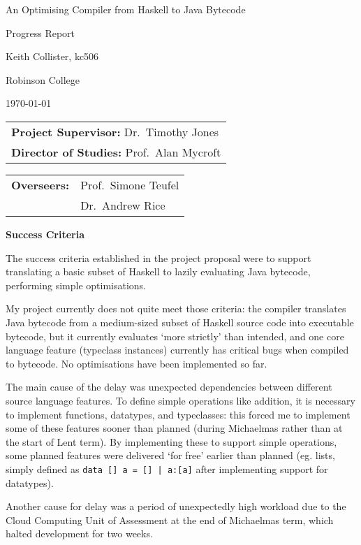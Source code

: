 \documentclass[11pt]{article}
\newcommand\haskell[1]{\texttt{#1}}
\begin{document}
\thispagestyle{empty}

\centerline{\large An Optimising Compiler from Haskell to Java Bytecode}
\centerline{\large Progress Report}
\vspace{0.2in}

\centerline{Keith Collister, kc506}
\centerline{Robinson College}
\centerline{\today}

\vspace{0.2in}



\begin{tabular}[t]{@{}l}
{\bf Project Supervisor:} Dr.\ Timothy Jones\\[3mm]
{\bf Director of Studies:} Prof.\ Alan Mycroft
\end{tabular}
\hfill
\begin{tabular}[t]{@{}l @{}l}
{\bf Overseers: } & Prof.\ Simone Teufel \\[3mm]
& Dr.\ Andrew Rice
\end{tabular}

\vspace{0.3in}

\large{\bf Success Criteria}

The success criteria established in the project proposal were to support translating a basic subset of Haskell to lazily
evaluating Java bytecode, performing simple optimisations.

My project currently does not quite meet those criteria: the compiler translates Java bytecode from a medium-sized
subset of Haskell source code into executable bytecode, but it currently evaluates `more strictly' than intended, and
one core language feature (typeclass instances) currently has critical bugs when compiled to bytecode. No optimisations
have been implemented so far.

The main cause of the delay was unexpected dependencies between different source language features. To define simple
operations like addition, it is necessary to implement functions, datatypes, and typeclasses: this forced me to
implement some of these features sooner than planned (during Michaelmas rather than at the start of Lent term). By
implementing these to support simple operations, some planned features were delivered `for free' earlier than planned
(eg. lists, simply defined as \haskell{data [] a = [] | a:[a]} after implementing support for datatypes).

Another cause for delay was a period of unexpectedly high workload due to the Cloud Computing Unit of Assessment at the
end of Michaelmas term, which halted development for two weeks.
\end{document}

